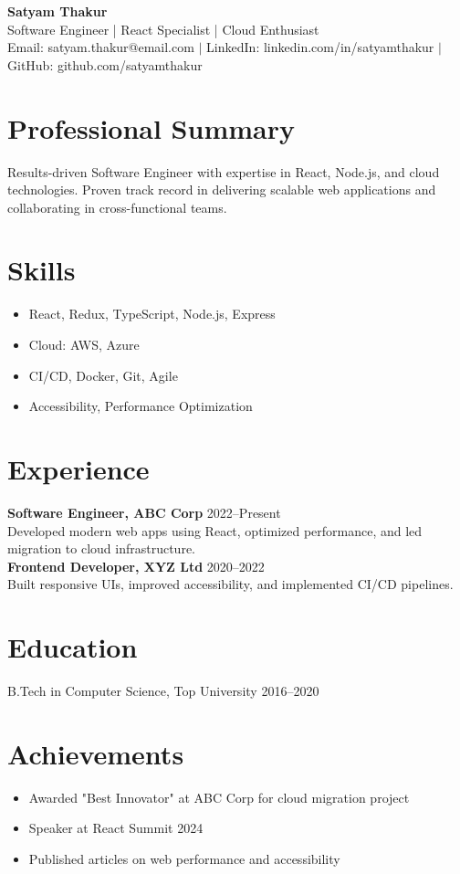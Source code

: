 \documentclass[a4paper,10pt]{article}
\begin{document}
\begin{center}
    {\LARGE \textbf{Satyam Thakur}} \\[2pt]
    Software Engineer | React Specialist | Cloud Enthusiast \\[2pt]
    Email: satyam.thakur@email.com $\vert$ LinkedIn: linkedin.com/in/satyamthakur $\vert$ GitHub: github.com/satyamthakur
\end{center}

\section*{Professional Summary}
Results-driven Software Engineer with expertise in React, Node.js, and cloud technologies. Proven track record in delivering scalable web applications and collaborating in cross-functional teams.

\section*{Skills}
\begin{itemize}[leftmargin=*]
    \item React, Redux, TypeScript, Node.js, Express
    \item Cloud: AWS, Azure
    \item CI/CD, Docker, Git, Agile
    \item Accessibility, Performance Optimization
\end{itemize}

\section*{Experience}
\textbf{Software Engineer, ABC Corp} \hfill 2022--Present\\
Developed modern web apps using React, optimized performance, and led migration to cloud infrastructure.\\
\textbf{Frontend Developer, XYZ Ltd} \hfill 2020--2022\\
Built responsive UIs, improved accessibility, and implemented CI/CD pipelines.

\section*{Education}
B.Tech in Computer Science, Top University \hfill 2016--2020

\section*{Achievements}
\begin{itemize}[leftmargin=*]
    \item Awarded "Best Innovator" at ABC Corp for cloud migration project
    \item Speaker at React Summit 2024
    \item Published articles on web performance and accessibility
\end{itemize}
\end{document}
